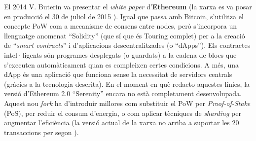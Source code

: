 \documentclass[11pt,a4paper]{article}
\begin{document}
El 2014 V. Buterin va presentar el \textit{white paper} d'\textbf{Ethereum} \cite{vuterin2014} (la xarxa es va posar en producció el 30 de juliol de 2015 \cite{tual2015}). Igual que passa amb Bitcoin, s'utilitza el concepte PoW com a mecanisme de consens entre nodes, però s'incorpora un llenguatge anomenat ``Solidity'' (que sí que és Touring complet) per a la creació de ``\textit{smart contracts}'' i d'aplicacions descentralitzades (o ``dApps''). Els contractes intel·ligents són programes desplegats (o guardats) a la cadena de blocs que s'executen automàticament quan es compleixen certes condicions. A més, una dApp és una aplicació que funciona sense la necessitat de servidors centrals (gràcies a la tecnologia descrita). En el moment en què redacto aquestes línies, la versió d'Ethereum 2.0 ``Serenity'' encara no està completament desenvolupada. Aquest nou \textit{fork} ha d'introduir millores com substituir el PoW per \textit{Proof-of-Stake} (PoS), per reduir el consum d'energia, o com aplicar tècniques de \textit{sharding} per augmentar l'eficiència (la versió actual de la xarxa no arriba a suportar les 20 transaccions per segon \cite{mech2018}).
\end{document}
